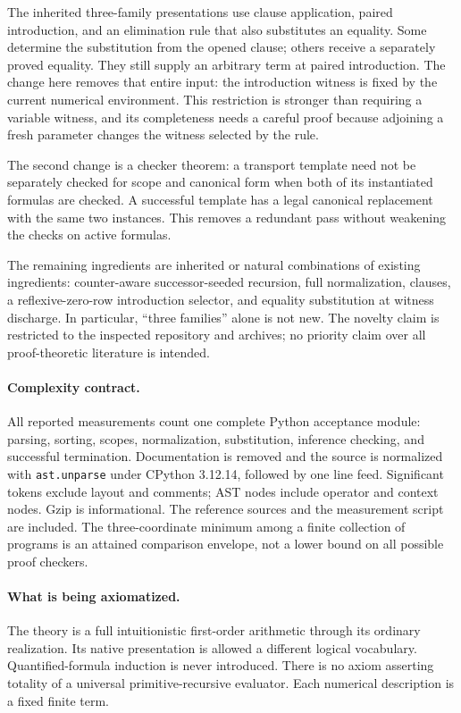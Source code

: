 \documentclass[11pt]{article}
\theoremstyle{definition}\newtheorem{definition}[theorem]{Definition}
\theoremstyle{remark}\newtheorem{remark}[theorem]{Remark}
\begin{document}
The inherited three-family presentations use clause application,
paired introduction, and an elimination rule that also substitutes an
equality. Some determine the substitution from the opened clause; others
receive a separately proved equality. They still supply an arbitrary
term at paired introduction. The change here removes that entire input:
the introduction witness is fixed by the current numerical environment.
This restriction is stronger than requiring a variable witness, and its
completeness needs a careful proof because adjoining a fresh parameter
changes the witness selected by the rule.

The second change is a checker theorem: a transport template need not
be separately checked for scope and canonical form when both of its
instantiated formulas are checked. A successful template has a legal
canonical replacement with the same two instances. This removes a
redundant pass without weakening the checks on active formulas.

The remaining ingredients are inherited or natural combinations of
existing ingredients: counter-aware successor-seeded recursion, full
normalization, clauses, a reflexive-zero-row introduction selector,
and equality substitution at witness discharge. In particular,
``three families'' alone is not new. The novelty claim is restricted to
the inspected repository and archives; no priority claim over all
proof-theoretic literature is intended.

\paragraph{Complexity contract.}
All reported measurements count one complete Python acceptance module:
parsing, sorting, scopes, normalization, substitution, inference checking,
and successful termination. Documentation is removed and the source is
normalized with \texttt{ast.unparse} under CPython 3.12.14, followed by one
line feed. Significant tokens exclude layout and comments; AST nodes
include operator and context nodes. Gzip is informational. The reference
sources and the measurement script are included. The three-coordinate
minimum among a finite collection of programs is an attained comparison
envelope, not a lower bound on all possible proof checkers.

\paragraph{What is being axiomatized.}
The theory is a full intuitionistic first-order arithmetic through its
ordinary realization. Its native presentation is allowed a different
logical vocabulary. Quantified-formula induction is never introduced.
There is no axiom asserting totality of a universal primitive-recursive
evaluator. Each numerical description is a fixed finite term.
\end{document}
